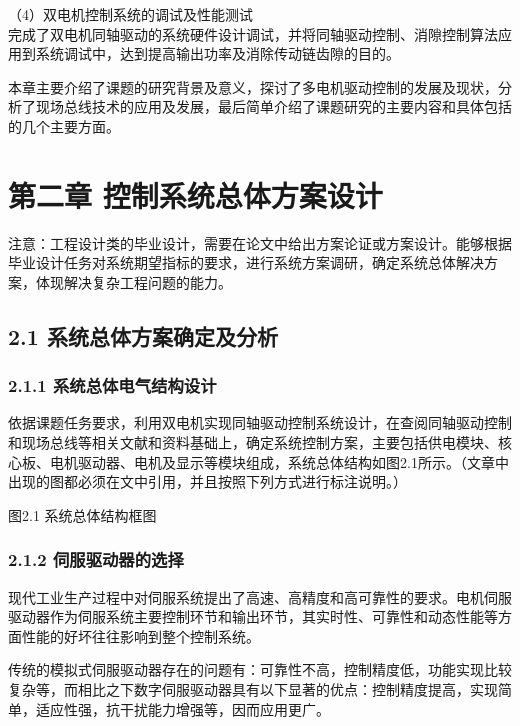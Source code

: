 \documentclass[UTF8,zihao=-4,openany,oneside]{ctexbook}
\begin{document}
\noindent （4）双电机控制系统的调试及性能测试\\

完成了双电机同轴驱动的系统硬件设计调试，并将同轴驱动控制、消隙控制算法应用到系统调试中，达到提高输出功率及消除传动链齿隙的目的。

本章主要介绍了课题的研究背景及意义，探讨了多电机驱动控制的发展及现状，分析了现场总线技术的应用及发展，最后简单介绍了课题研究的主要内容和具体包括的几个主要方面。

\chapter{第二章 控制系统总体方案设计}

注意：工程设计类的毕业设计，需要在论文中给出方案论证或方案设计。能够根据毕业设计任务对系统期望指标的要求，进行系统方案调研，确定系统总体解决方案，体现解决复杂工程问题的能力。

\section{2.1 系统总体方案确定及分析}

\subsection{2.1.1 系统总体电气结构设计}

依据课题任务要求，利用双电机实现同轴驱动控制系统设计，在查阅同轴驱动控制和现场总线等相关文献和资料基础上，确定系统控制方案，主要包括供电模块、核心板、电机驱动器、电机及显示等模块组成，系统总体结构如图2.1所示。（文章中出现的图都必须在文中引用，并且按照下列方式进行标注说明。）

\begin{center}图2.1 系统总体结构框图\end{center}

\subsection{2.1.2 伺服驱动器的选择}

现代工业生产过程中对伺服系统提出了高速、高精度和高可靠性的要求。电机伺服驱动器作为伺服系统主要控制环节和输出环节，其实时性、可靠性和动态性能等方面性能的好坏往往影响到整个控制系统。

传统的模拟式伺服驱动器存在的问题有：可靠性不高，控制精度低，功能实现比较复杂等，而相比之下数字伺服驱动器具有以下显著的优点：控制精度提高，实现简单，适应性强，抗干扰能力增强等，因而应用更广。
\end{document}
